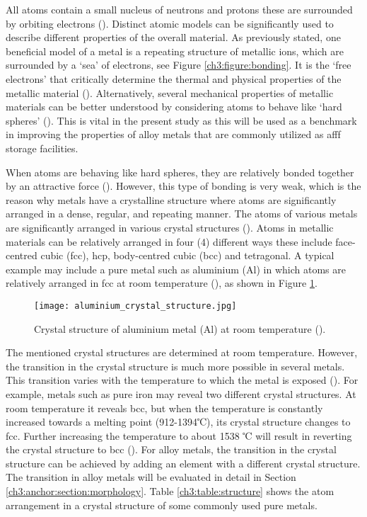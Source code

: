 All atoms contain a small nucleus of neutrons and protons these are surrounded by orbiting electrons (\cite{hench2005biomaterials}). Distinct atomic models can be significantly used to describe different properties of the overall material. As previously stated, one beneficial model of a metal is a repeating structure of metallic ions, which are surrounded by a ‘sea’ of electrons, see Figure \ref{ch3:figure:bonding}. It is the ‘free electrons’ that critically determine the thermal and physical properties of the metallic material (\cite{hench2005biomaterials}). Alternatively, several mechanical properties of metallic materials can be better understood by considering atoms to behave like ‘hard spheres’ (\cite{hench2005biomaterials}). This is vital in the present study as this will be used as a benchmark in improving the properties of alloy metals that are commonly utilized as \acrshort{afff} storage facilities.

When atoms are behaving like hard spheres, they are relatively bonded together by an attractive force (\cite{lepetit2017topological}). However, this type of bonding is very weak, which is the reason why metals have a crystalline structure where atoms are significantly arranged in a dense, regular, and repeating manner. The atoms of various metals are significantly arranged in various crystal structures (\cite{hench2005biomaterials}). Atoms in metallic materials can be relatively arranged in four (4) different ways these include face-centred cubic (\acrshort{fcc}), \acrfull{hcp}, body-centred cubic (\acrshort{bcc}) and tetragonal. A typical example may include a pure metal such as aluminium (Al) in which atoms are relatively arranged in \acrshort{fcc} at room temperature (\cite{hench2005biomaterials}), as shown in Figure \ref{ch3:figure:aluminium}.
 
\begin{figure}[H]
    \centering
    \texttt{[image: aluminium\_crystal\_structure.jpg]}
    \caption{Crystal structure of aluminium metal (Al) at room temperature (\cite{hench2005biomaterials}).}
    \label{ch3:figure:aluminium}
\end{figure}

The mentioned crystal structures are determined at room temperature.  However, the transition in the crystal structure is much more possible in several metals. This transition varies with the temperature to which the metal is exposed (\cite{callister2018materials}). For example, metals such as pure iron may reveal two different crystal structures. At room temperature it reveals \acrshort{bcc}, but when the temperature is constantly increased towards a melting point (912-1394℃), its crystal structure changes to \acrshort{fcc}. Further increasing the temperature to about 1538 ℃ will result in reverting the crystal structure to \acrshort{bcc} (\cite{ali2020empirical, molabe2018determining}). For alloy metals, the transition in the crystal structure can be achieved by adding an element with a different crystal structure. The transition in alloy metals will be evaluated in detail in Section \ref{ch3:anchor:section:morphology}. Table \ref{ch3:table:structure} shows the atom arrangement in a crystal structure of some commonly used pure metals.

